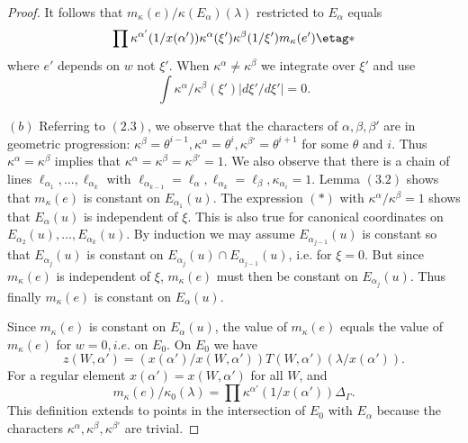 \documentclass{memo-l}
\theoremstyle{definition}
\theoremstyle{remark}
\numberwithin{section}{chapter}
\numberwithin{equation}{chapter}
\begin{document}
\begin{proof}
It follows that $m_{{\kappa}}(e)/{\kappa}(E_{{\alpha}})({\lambda})$
restricted to $E_{{\alpha}}$ equals
$$
\prod{\kappa}^{{\alpha}'}(1/x({\alpha}')){\kappa}^{{\alpha}}({\xi}')
{\kappa}^{{\beta}}(1/{\xi}')m_{{\kappa}}(e')\etag *
$$
where $e'$ depends on $w$ not ${\xi}'$.  When ${\kappa}^{{\alpha}} \ne
{\kappa}^{{\beta}}$ we integrate over ${\xi}'$ and use \cite{MR748510}
$$
\int {\kappa}^{{\alpha}}/{\kappa}^{{\beta}}({\xi}')\vert
d{\xi}'/d{\xi}'\vert  =  0.
$$

   $(b)$ Referring to $(2.3)$, we observe that the characters of ${\alpha},
{\beta}, {\beta}'$ are in geometric progression: ${\kappa}^{{\beta}}  =
{\theta}^{i-1}, {\kappa}^{{\alpha}}  =  {\theta}^{i}, {\kappa}^{{\beta}'}  =
{\theta}^{i+1}$ for some ${\theta}$ and $i$.  Thus ${\kappa}^{{\alpha}}  =
{\kappa}^{{\beta}}$ implies that ${\kappa}^{{\alpha}}  =  {\kappa}^{{\beta}}  =
{\kappa}^{{\beta}'}  =  1$.  We also observe that there is a chain of lines
${\ell}_{{\alpha_1}} ,\ldots ,{\ell}_{{\alpha_k}}$ with
${\ell}_{{\alpha_{k-1}}}  =  {\ell}_{{\alpha}}, {\ell}_{{\alpha_k}}  =
{\ell}_{{\beta}}, {\kappa}_{{\alpha_i}}  =  1$.  Lemma $(3.2)$ shows that
$m_{{\kappa}}(e)$ is constant on $E_{{\alpha_1}} (u)$.  The expression
$(*)$ with ${\kappa}^{{\alpha}}/{\kappa}^{{\beta}}  =  1$ shows that
$E_{{\alpha}}(u)$ is independent of ${\xi}$.  This is also true for
canonical coordinates on $E_{{\alpha_2}} (u), \ldots , E_{{\alpha_k}} (u)$.
By induction we may assume $E_{{\alpha_{j-1}}} (u)$ is constant so that
$E_{{\alpha_j}} (u)$ is constant on $E_{{\alpha_j}} (u)  \cap
E_{{\alpha_{j-1}}} (u)$, i.e.  for ${\xi} = 0$.  But since $m_{{\kappa}}(e)$
is independent of ${\xi}$, $m_{{\kappa}}(e)$ must then be constant on
$E_{{\alpha_j}} (u)$.  Thus finally $m_{{\kappa}}(e)$ is constant on
$E_{{\alpha}}(u)$.

   Since $m_{{\kappa}}(e)$ is constant on $E_{{\alpha}}(u)$, the value of
$m_{{\kappa}}(e)$ equals the value of $m_{{\kappa}}(e)$ for $w  =  0, i.e$.
on $E_{0}$.  On $E_{0}$ we have $$z(W,{\alpha}')  =
(x({\alpha}')/x(W,{\alpha}'))T(W,{\alpha}')({\lambda}/x({\alpha}')).$$  For
a regular element $x({\alpha}')  =  x(W,{\alpha}')$ for all $W$, and
$$m_{{\kappa}}(e)/{\kappa}_{0}({\lambda})= \prod{\kappa}^{{\alpha}'}(1/x({\alpha}')){\Delta}_{{\Gamma}}.$$
This definition extends to points in the intersection of $E_{0}$ with
$E_{{\alpha}}$ because the characters ${\kappa}^{{\alpha}},
{\kappa}^{{\beta}}, {\kappa}^{{\beta}'}$ are trivial.
\end{proof}

\end{document}
